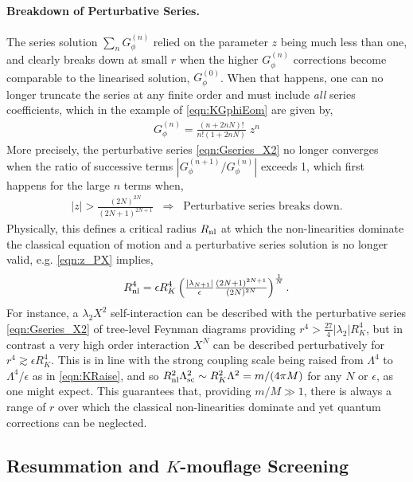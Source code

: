 \documentclass[11pt]{article}
\begin{document}
\paragraph{Breakdown of Perturbative Series.}
The series solution $\sum_{n} G_\phi^{(n)}$ relied on the parameter $z$ being much less than one, and clearly breaks down at small $r$ when the higher $G_\phi^{(n)}$ corrections become comparable to the linearised solution, $G_\phi^{(0)}$. When that happens, one can no longer truncate the series at any finite order and must include \emph{all} series coefficients, which in the example of \eqref{eqn:KGphiEom} are given by,
\begin{align}
 G_\phi^{(n)} =  \frac{ (n + 2 n N)! }{n! ( 1 + 2 n N )}  \;  z^n
 \label{eqn:Gseries_XN}
\end{align}
More precisely, the perturbative series \eqref{eqn:Gseries_X2} no longer converges when the ratio of successive terms $| G^{(n+1)}_\phi / G^{(n)}_\phi |$ exceeds 1, which first happens for the large $n$ terms when,
\begin{align}
|z| > \frac{ (2N)^{2N} }{ (2N+1)^{2N+1} }  \;\; \Rightarrow \;\; \text{Perturbative series breaks down}  .
\label{eqn:znl}
\end{align}
Physically, this defines a critical radius $R_{\rm nl}$ at which the non-linearities dominate the classical equation of motion and a perturbative series solution is no longer valid, e.g. \eqref{eqn:z_PX} implies,
\begin{align}
R_{\rm nl}^{4} =  \epsilon R_K^{4}  \left( \tfrac{|\lambda_{N+1} |}{ \epsilon} \tfrac{(2N+1)^{2N+1}}{(2N)^{2N}}  \right)^{\frac{1}{N}} .
\label{eqn:Rnl}
\end{align}
For instance, a $\lambda_2 X^2$ self-interaction can be described with the perturbative series \eqref{eqn:Gseries_X2} of tree-level Feynman diagrams providing $r^4 > \tfrac{27}{4} |\lambda_2| R_K^4 $, but in contrast a very high order interaction $X^N$ can be described perturbatively for $r^4 \gtrsim \epsilon R_K^4$. 
This is in line with the strong coupling scale being raised from $\Lambda^4$ to $\Lambda^4/\epsilon$ as in \eqref{eqn:KRaise}, and so $R_{\rm nl}^2 \Lambda_{\rm sc}^2 \sim  R_K^2 \Lambda^2 = m/(4\pi M)$ for any $N$ or $\epsilon$, as one might expect. This guarantees that, providing $m/M \gg 1$, there is always a range of $r$ over which the classical non-linearities dominate and yet quantum corrections can be neglected. 



\subsection{Resummation and $K$-mouflage Screening}
\label{sec:PX_screening}
\end{document}
